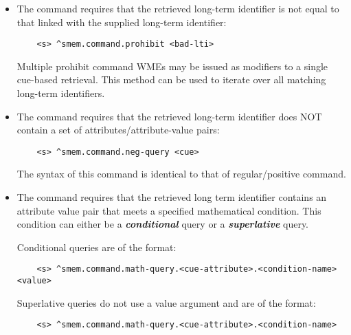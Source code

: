 \begin{itemize}
\item
	The  command requires that the retrieved long-term identifier is not equal to that linked with the supplied long-term identifier:

	\vspace{-6pt}
	\begin{verbatim}
	<s> ^smem.command.prohibit <bad-lti>
	\end{verbatim}
	\vspace{-6pt}

	Multiple prohibit command WMEs may be issued as modifiers to a single cue-based retrieval.
	This method can be used to iterate over all matching long-term identifiers.
\item
	The  command requires that the retrieved long-term identifier does NOT contain a set of attributes/attribute-value pairs:

	\vspace{-6pt}
	\begin{verbatim}
	<s> ^smem.command.neg-query <cue>
	\end{verbatim}
	\vspace{-6pt}

	The syntax of this command is identical to that of regular/positive  command.
\item
	The  command requires that the retrieved long term identifier contains an attribute value pair that meets a specified mathematical condition.
	This condition can either be a \textit{\textbf{conditional}} query or a \textit{\textbf{superlative}} query.

	Conditional queries are of the format:

	\vspace{-6pt}
	\begin{verbatim}
	<s> ^smem.command.math-query.<cue-attribute>.<condition-name> <value>
	\end{verbatim}
	\vspace{-6pt}

	Superlative queries do not use a value argument and are of the format:

	\vspace{-6pt}
	\begin{verbatim}
	<s> ^smem.command.math-query.<cue-attribute>.<condition-name>
	\end{verbatim}
	\vspace{-6pt}


\end{itemize}
